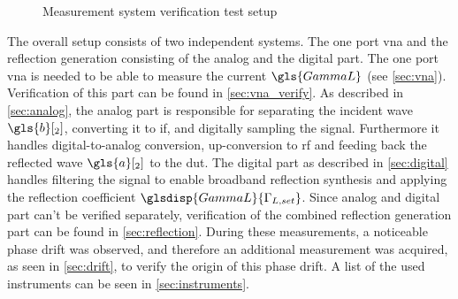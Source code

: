 \documentclass[12pt,a4paper,parskip=full,abstract=true,BCOR=12mm,twoside,open=right]{scrreprt}
\makeatletter
\newcommand\currentcoordinate{\the\tikz@lastxsaved,\the\tikz@lastysaved}
\makeatother
\begin{document}
\begin{figure}[htb]
{
    }
    \caption{Measurement system verification test setup}
    \label{fig:test_setup}
\end{figure}

The overall setup consists of two independent systems. The one port \gls{vna} and
the reflection generation consisting of the analog and the digital part. The
one port \gls{vna} is needed to be able to measure the current $\gls{GammaL}$ (see
\cref{sec:vna}). Verification of this part can be found in \cref{sec:vna_verify}. As
described in \cref{sec:analog}, the analog part is responsible for separating the
incident wave $\gls{b}[_2]$, converting it to \gls{if}, and digitally sampling the signal.
Furthermore it handles digital-to-analog conversion, up-conversion to \gls{rf} and
feeding back the reflected wave $\gls{a}[_2]$ to the \gls{dut}. The digital part as described
in \cref{sec:digital} handles filtering the signal to enable broadband reflection
synthesis and applying the reflection coefficient $\glsdisp{GammaL}{\Gamma_{L,set}}$. Since analog and
digital part can't be verified separately, verification of the combined reflection
generation part can be found in \cref{sec:reflection}. During these measurements,
a noticeable phase drift was observed, and therefore an additional measurement was
acquired, as seen in \cref{sec:drift}, to verify the origin
of this phase drift. A list of the used instruments can be seen in \cref{sec:instruments}.
\end{document}
